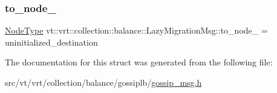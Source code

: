 \subsubsection{\texorpdfstring{to\+\_\+node\+\_\+}{to\_node\_}}
{\footnotesize\ttfamily \hyperlink{namespacevt_a866da9d0efc19c0a1ce79e9e492f47e2}{Node\+Type} vt\+::vrt\+::collection\+::balance\+::\+Lazy\+Migration\+Msg\+::to\+\_\+node\+\_\+ = uninitialized\+\_\+destination\hspace{0.3cm}{\ttfamily [private]}}



The documentation for this struct was generated from the following file\+:\begin{DoxyCompactItemize}
\item 
src/vt/vrt/collection/balance/gossiplb/\hyperlink{gossip__msg_8h}{gossip\+\_\+msg.\+h}\end{DoxyCompactItemize}
